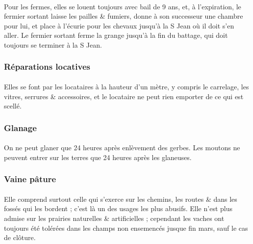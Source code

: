 \documentclass[../eBook.tex]{subfiles}
\begin{document}
      \paragraph{}Pour les fermes, elles se louent toujours avec bail de 9 ans, et, à l'expiration, le fermier sortant laisse les pailles \& fumiers, donne à son successeur une chambre pour lui, et place à l'écurie pour les chevaux jusqu'à la S Jean où il doit s'en aller. Le fermier sortant ferme la grange jusqu'à la fin du battage, qui doit toujours se terminer à la S Jean.

    \subsubsection*{Réparations locatives}
      \paragraph{}Elles se font par les locataires à la hauteur d'un mètre, y compris le carrelage, les vitres, serrures \& accessoires, et le locataire ne peut rien emporter de ce qui est scellé.

    \subsubsection*{Glanage}
      \paragraph{}On ne peut glaner que 24 heures après enlèvement des gerbes. Les moutons ne peuvent entrer sur les terres que 24 heures après les glaneuses.

    \subsubsection*{Vaine pâture}
      \paragraph{}Elle comprend surtout celle qui s'exerce sur les chemins, les routes \& dans les fossés qui les bordent ; c'est là un des usages les plus abusifs. Elle n'est plus admise sur les prairies naturelles \& artificielles ; cependant les vaches ont toujours été tolérées dans les champs non ensemencés jusque fin mars, sauf le cas de clôture.
\end{document}
